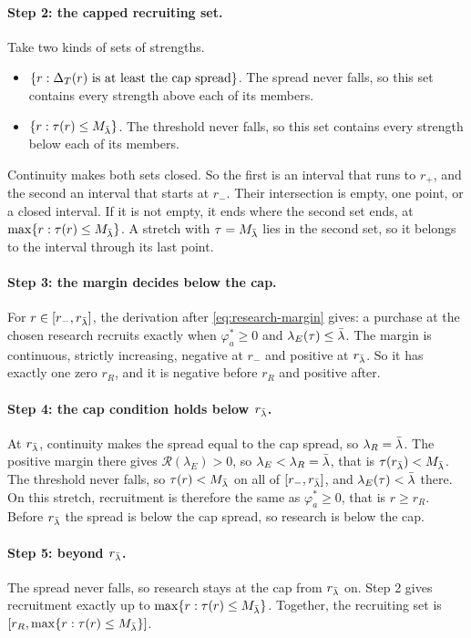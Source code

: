 \paragraph{Step 2: the capped recruiting set.} Take two kinds of sets of strengths.
\begin{itemize}
\item \(\{r:\Delta_T(r)\ \text{is at least the cap spread}\}\). The spread never falls, so this set contains every strength
above each of its members.
\item \(\{r:\tau(r)\le M_{\bar\lambda}\}\). The threshold never falls, so this set contains every strength below each of its
members.
\end{itemize}
Continuity makes both sets closed. So the first is an interval that runs to \(r_+\), and the second an interval that
starts at \(r_-\). Their intersection is empty, one point, or a closed interval. If it is not empty, it ends where the
second set ends, at \(\max\{r:\tau(r)\le M_{\bar\lambda}\}\). A stretch with \(\tau=M_{\bar\lambda}\) lies in the second set, so it
belongs to the interval through its last point.

\paragraph{Step 3: the margin decides below the cap.} For \(r\in[r_-,r_{\bar\lambda}]\), the derivation after
\eqref{eq:research-margin} gives: a purchase at the chosen research recruits exactly when \(\varphi_a^*\ge0\) and
\(\lambda_E(\tau)\le\bar\lambda\). The margin is continuous, strictly increasing, negative at \(r_-\) and positive at
\(r_{\bar\lambda}\). So it has exactly one zero \(r_R\), and it is negative before \(r_R\) and positive after.

\paragraph{Step 4: the cap condition holds below \(r_{\bar\lambda}\).} At \(r_{\bar\lambda}\), continuity makes the spread equal to the
cap spread, so \(\lambda_R=\bar\lambda\). The positive margin there gives \(\mathcal R(\lambda_E)>0\), so
\(\lambda_E<\lambda_R=\bar\lambda\), that is \(\tau(r_{\bar\lambda})<M_{\bar\lambda}\). The threshold never falls, so \(\tau(r)<M_{\bar\lambda}\) on all
of \([r_-,r_{\bar\lambda}]\), and \(\lambda_E(\tau)<\bar\lambda\) there. On this stretch, recruitment is therefore the same as
\(\varphi_a^*\ge0\), that is \(r\ge r_R\). Before \(r_{\bar\lambda}\) the spread is below the cap spread, so research is below
the cap.

\paragraph{Step 5: beyond \(r_{\bar\lambda}\).} The spread never falls, so research stays at the cap from \(r_{\bar\lambda}\) on. Step 2
gives recruitment exactly up to \(\max\{r:\tau(r)\le M_{\bar\lambda}\}\). Together, the recruiting set is
\([r_R,\max\{r:\tau(r)\le M_{\bar\lambda}\}]\).

